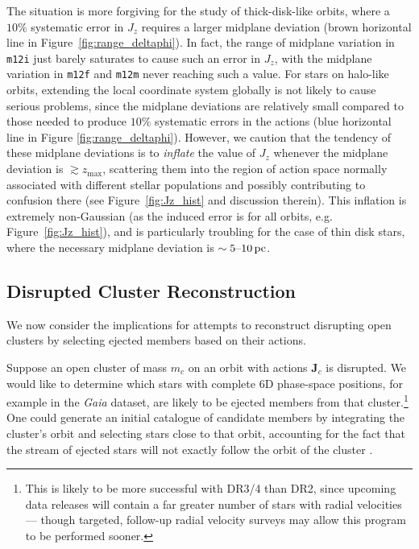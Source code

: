 \documentclass[twocolumn]{aastex62}
\newcommand{\pc}{\text{pc}}
\newcommand{\mi}{\texttt{m12i}}
\newcommand{\mf}{\texttt{m12f}}
\newcommand{\mm}{\texttt{m12m}}
\newcommand{\thickcolor}{brown}
\newcommand{\halocolor}{blue}
\begin{document}
The situation is more forgiving for the study of thick-disk-like orbits, where
a $10\%$ systematic error in $J_z$ requires a larger midplane
deviation (\thickcolor{} horizontal line in Figure~\ref{fig:range_deltaphi}).
In fact, the range of midplane variation in \mi{} just barely saturates to
cause such an error in $J_z$, with the midplane variation in \mf{} and \mm{}
never reaching such a value. For stars on halo-like orbits, extending the
local coordinate system globally is not likely to cause serious problems,
since the midplane deviations are relatively small compared to those needed to
produce $10\%$ systematic errors in the actions (\halocolor{}
horizontal line in Figure \ref{fig:range_deltaphi}). However, we caution that
the tendency of these midplane deviations is to \emph{inflate} the value of
$J_z$ whenever the midplane deviation is $\gtrsim z_{\text{max}}$, scattering
them into the region of action space normally associated with different
stellar populations and possibly contributing to confusion there (see
Figure~\ref{fig:Jz_hist} and discussion therein). This inflation is extremely
non-Gaussian (as the induced error is for all orbits, e.g.
Figure~\ref{fig:Jz_hist}), and is particularly troubling for the case of thin
disk stars, where the necessary midplane deviation is
$\sim5\textup{--}10\,\pc$.

\subsection{Disrupted Cluster Reconstruction}
\label{sssec:reconstruction}

We now consider the implications for attempts to reconstruct disrupting open
clusters by selecting ejected members based on their actions.

Suppose an open cluster of mass $m_c$ on an orbit with actions $\bm{J}_c$ is
disrupted. We would like to determine which stars with complete 6D phase-space
positions, for example in the {\em Gaia} dataset, are likely to be ejected members from that cluster.\footnote{This is likely to
be more successful with DR3/4 than DR2, since upcoming data releases will
contain a far greater number of stars with radial velocities --- though
targeted, follow-up radial velocity surveys may allow this program to be
performed sooner.} One
could generate an initial catalogue of candidate members by integrating the
cluster's orbit and selecting stars close to that orbit, accounting for the
fact that the stream of ejected stars will not exactly follow the orbit of the
cluster \citep[e.g.][]{2011MNRAS.413.1852E}.
\end{document}
